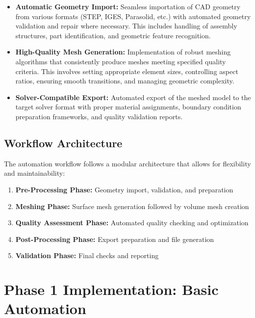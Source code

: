 \documentclass{book}
\begin{document}
\begin{itemize}[leftmargin=*,label=\textbullet]
\begin{itemize}[leftmargin=*,label=\textbullet]
    \item \textbf{Automatic Geometry Import:} Seamless importation of CAD geometry from various formats (STEP, IGES, Parasolid, etc.) with automated geometry validation and repair where necessary. This includes handling of assembly structures, part identification, and geometric feature recognition.
    
    \item \textbf{High-Quality Mesh Generation:} Implementation of robust meshing algorithms that consistently produce meshes meeting specified quality criteria. This involves setting appropriate element sizes, controlling aspect ratios, ensuring smooth transitions, and managing geometric complexity.
    
    \item \textbf{Solver-Compatible Export:} Automated export of the meshed model to the target solver format with proper material assignments, boundary condition preparation frameworks, and quality validation reports.
\end{itemize}

\subsection{Workflow Architecture}

The automation workflow follows a modular architecture that allows for flexibility and maintainability:

\begin{enumerate}
    \item \textbf{Pre-Processing Phase:} Geometry import, validation, and preparation
    \item \textbf{Meshing Phase:} Surface mesh generation followed by volume mesh creation
    \item \textbf{Quality Assessment Phase:} Automated quality checking and optimization
    \item \textbf{Post-Processing Phase:} Export preparation and file generation
    \item \textbf{Validation Phase:} Final checks and reporting
\end{enumerate}

\section{Phase 1 Implementation: Basic Automation}


\end{itemize}
\end{document}
